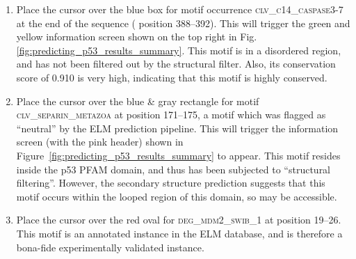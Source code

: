 \documentclass[12pt]{article}
\newcommand\motif[1]{%
    \textsc{\lowercase{#1}}%
}
\begin{document}
\begin{enumerate}

	\item Place the cursor over the blue box for motif occurrence
		\motif{CLV\_C14\_Caspase3-7} at the end of the sequence (
		position 388--392). This will trigger the green and yellow
		information screen shown on the top right in Fig.
		\ref{fig:predicting_p53_results_summary}.
		This motif is in a disordered region, and has not been
		filtered out by the structural filter. Also, its conservation score
		of 0.910 is very high, indicating that this motif is highly conserved.


	\item \label{sec:predicting_p53_results_structure_filter} Place the cursor over the blue \& gray rectangle for motif
		\motif{CLV\_Separin\_Metazoa} at position 171--175, a motif
		which was flagged as ``neutral'' by the ELM prediction pipeline.
		This will trigger the information screen (with the pink header) shown
		in Figure~\ref{fig:predicting_p53_results_summary} to appear.
		This motif resides inside the p53 PFAM domain, and thus has been
		subjected to ``structural filtering''. However, the secondary structure
		prediction suggests that this motif occurs within the looped region of this
		domain, so may be accessible.


	\item Place the cursor over the red oval for \motif{DEG\_MDM2\_SWIB\_1} at
		position 19--26. This motif is an annotated instance in the
		ELM database, and is therefore a bona-fide experimentally validated
		instance.



\end{enumerate}
\end{document}
